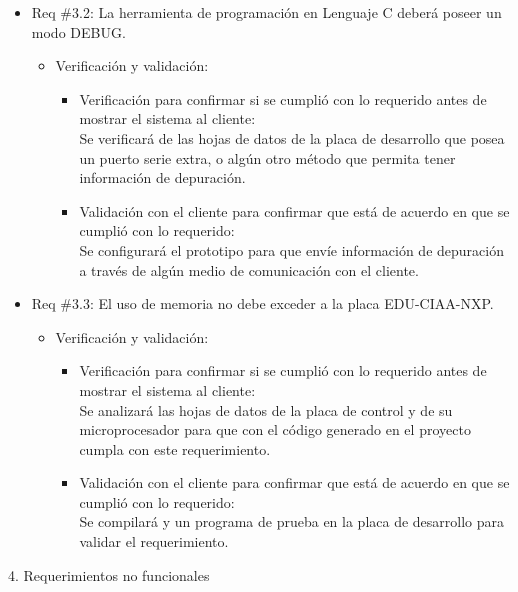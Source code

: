 \documentclass[11pt]{charter}
\begin{document}
\begin{itemize}
\item Req \#3.2: La herramienta de programación en Lenguaje C deberá poseer un modo DEBUG.
\begin{itemize}
\item Verificación y validación:
	\begin{itemize}
	\item Verificación para confirmar si se cumplió con lo requerido 	antes de mostrar el sistema al cliente:\\
	Se verificará de las hojas de datos de la placa de desarrollo
	que posea un puerto serie extra, o algún otro método que permita tener información de depuración. 
	\item Validación con el cliente para confirmar que está de 				acuerdo en que se cumplió con lo requerido:\\
	Se configurará el prototipo para que envíe información de depuración a través de algún medio de comunicación con el cliente.
	\end{itemize}
\end{itemize}
\end{itemize}

\begin{itemize}
\item Req \#3.3: El uso de memoria no debe exceder a la placa EDU-CIAA-NXP.
\begin{itemize}
\item Verificación y validación:
	\begin{itemize}
	\item Verificación para confirmar si se cumplió con lo requerido 	antes de mostrar el sistema al cliente:\\
	Se analizará las hojas de datos de la placa de control y de su
	microprocesador para que con el código generado en el proyecto cumpla con este requerimiento.
	\item Validación con el cliente para confirmar que está de 				acuerdo en que se cumplió con lo requerido:\\
	Se compilará y  un programa de prueba en la placa de
 	desarrollo para validar el requerimiento.
	\end{itemize}
\end{itemize}
\end{itemize}

4. Requerimientos no funcionales
\end{document}
